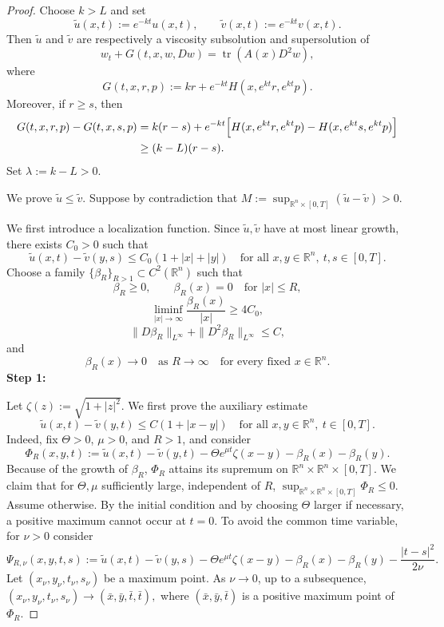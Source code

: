 \documentclass[preprint]{elsarticle}
\numberwithin{equation}{section}
\begin{document}
\begin{proof}
Choose \(k>L\) and set
\[
 \widetilde u(x,t):=e^{-kt}u(x,t),
 \qquad
 \widetilde v(x,t):=e^{-kt}v(x,t).
\]
Then \(\widetilde u\) and \(\widetilde v\) are respectively a viscosity subsolution and supersolution of
\[
 w_t+G(t,x,w,Dw)=\operatorname{tr}(A(x)D^2w),
\]
where
\[
 G(t,x,r,p):=kr+e^{-kt}H(x,e^{kt}r,e^{kt}p).
\]
Moreover, if \(r\ge s\), then
\[
\begin{aligned}
 G(t,x,r,p)-G(t,x,s,p)
 &=
 k(r-s)+e^{-kt}
 \Bigl[
 H(x,e^{kt}r,e^{kt}p)-H(x,e^{kt}s,e^{kt}p)
 \Bigr] \\
 &\ge (k-L)(r-s).
\end{aligned}
\]
Set $ \lambda:=k-L>0.$

We prove \(\widetilde u\le \widetilde v\). Suppose by contradiction that $M:=\sup_{\mathbb R^n\times[0,T]}(\widetilde u-\widetilde v)>0.$

We first introduce a localization function. Since \(\widetilde u,\widetilde v\) have at most linear growth, there exists \(C_0>0\) such that
\[
 \widetilde u(x,t)-\widetilde v(y,s)\le C_0(1+|x|+|y|)
 \quad\text{for all }x,y\in\mathbb R^n,\ t,s\in[0,T].
\]
Choose a family \(\{\beta_R\}_{R>1}\subset C^2(\mathbb R^n)\) such that
\[
 \beta_R\ge0,\qquad
 \beta_R(x)=0\quad\text{for }|x|\le R,
\]
\[
 \liminf_{|x|\to\infty}\frac{\beta_R(x)}{|x|}\ge 4C_0,
\]
\[
 \|D\beta_R\|_{L^\infty}+\|D^2\beta_R\|_{L^\infty}\le C,
\]
and
\[
 \beta_R(x)\to0
 \quad\text{as }R\to\infty
 \quad\text{for every fixed }x\in\mathbb R^n.
\]
\textbf{Step 1:}

Let $ \zeta(z):=\sqrt{1+|z|^2}.$
We first prove the auxiliary estimate
\[
 \widetilde u(x,t)-\widetilde v(y,t)
 \le
 C(1+|x-y|)
 \quad\text{for all }x,y\in\mathbb R^n,\ t\in[0,T].
\]
Indeed, fix \(\Theta>0\), \(\mu>0\), and \(R>1\), and consider
\[
 \Phi_R(x,y,t)
 :=
 \widetilde u(x,t)-\widetilde v(y,t)
 -
 \Theta e^{\mu t}\zeta(x-y)
 -
 \beta_R(x)-\beta_R(y).
\]
Because of the growth of \(\beta_R\), \(\Phi_R\) attains its supremum on \(\mathbb R^n\times\mathbb R^n\times[0,T]\). We claim that for \(\Theta,\mu\) sufficiently large, independent of \(R\), $ \sup_{\mathbb R^n\times\mathbb R^n\times[0,T]}\Phi_R\le0.$
Assume otherwise. By the initial condition and by choosing \(\Theta\) larger if necessary, a positive maximum cannot occur at \(t=0\). To avoid the common time variable, for \(\nu>0\) consider
\[
 \Psi_{R,\nu}(x,y,t,s)
 :=
 \widetilde u(x,t)-\widetilde v(y,s)
 -
 \Theta e^{\mu t}\zeta(x-y)
 -
 \beta_R(x)-\beta_R(y)
 -
 \frac{|t-s|^2}{2\nu}.
\]
Let \((x_\nu,y_\nu,t_\nu,s_\nu)\) be a maximum point. As \(\nu\to0\), up to a subsequence, $(x_\nu,y_\nu,t_\nu,s_\nu)\to(\bar x,\bar y,\bar t,\bar t),$
where \((\bar x,\bar y,\bar t)\) is a positive maximum point of \(\Phi_R\).


\end{proof}
\end{document}
